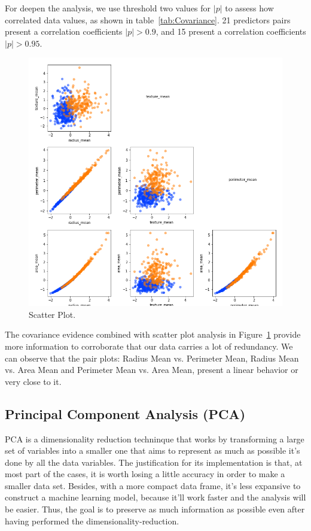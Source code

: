 \documentclass[conference]{IEEEtran}
\begin{document}
For deepen the analysis, we use threshold two values for $|p|$ to assess how correlated data values, as shown in table~\ref{tab:Covariance}. 21 predictors pairs present a correlation coefficients $|p| > 0.9$, and 15 present a correlation coefficients $|p| > 0.95$.

\begin{figure}[htbp!]
    \centerline{\includegraphics[width=0.5 \textwidth]{../../code/hw1/figures/4-1-scatter-plot-clip.png}}
    \caption{Scatter Plot.}
    \label{fig:4-1-scatter-plot}
\end{figure}

The covariance evidence combined with scatter plot analysis in Figure~\ref{fig:4-1-scatter-plot} provide more information to corroborate that our data carries a lot of redundancy. We can observe that the pair plots: Radius Mean vs. Perimeter Mean, Radius Mean vs. Area Mean and Perimeter Mean vs. Area Mean, present a linear behavior or very close to it.


\subsection{Principal Component Analysis (PCA)}

\cite{James2013, Ringner2001, Hastie2009, Kuhn2013}

PCA is a dimensionality reduction techninque that works by transforming a large set of variables into a smaller one that aims to represent as much as possible it's done by all the data variables. The justification for its implementation is that, at most part of the cases, it is worth losing a little accuracy in order to make a smaller data set. Besides, with a more compact data frame, it's less expansive to construct a machine learning model, because it'll work faster and the analysis will be easier. Thus, the goal is to preserve as much information as possible even after having performed the dimensionality-reduction.
\end{document}

